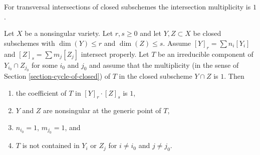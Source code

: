 \noindent
For transversal intersections of closed subschemes the intersection
multiplicity is $1$.

\begin{lemma}
\label{lemma-transversal-subschemes}
Let $X$ be a nonsingular variety. Let $r, s \geq 0$ and let
$Y, Z \subset X$ be closed subschemes with $\dim(Y) \leq r$ and
$\dim(Z) \leq s$. Assume $[Y]_r = \sum n_i[Y_i]$ and
$[Z]_s = \sum m_j[Z_j]$ intersect properly.
Let $T$ be an irreducible component of $Y_{i_0} \cap Z_{j_0}$
for some $i_0$ and $j_0$ and assume that the multiplicity
(in the sense of Section \ref{section-cycle-of-closed}) of $T$
in the closed subscheme $Y \cap Z$ is $1$.
Then
\begin{enumerate}
\item the coefficient of $T$ in $[Y]_r \cdot [Z]_s$ is $1$,
\item $Y$ and $Z$ are nonsingular at the generic point of $T$,
\item $n_{i_0} = 1$, $m_{j_0} = 1$, and
\item $T$ is not contained in $Y_i$ or $Z_j$ for $i \not = i_0$ and
$j \not = j_0$.
\end{enumerate}
\end{lemma}

